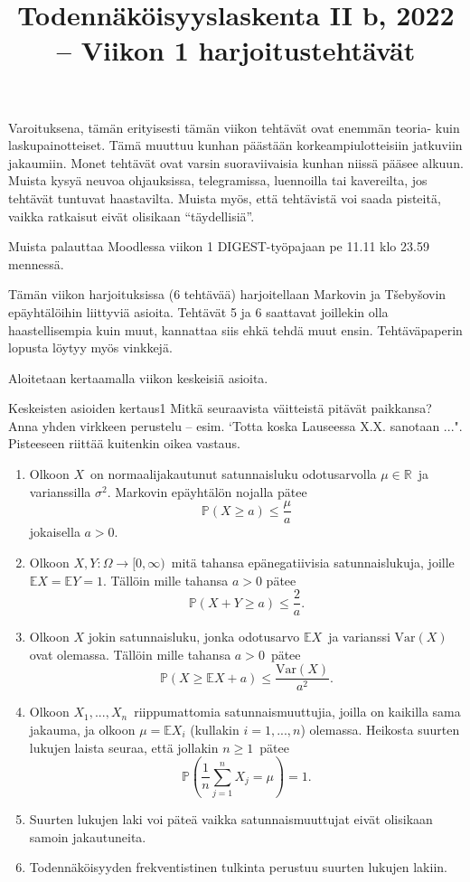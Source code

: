 \documentclass[11pt,a4paper]{amsart}
\title{Todennäköisyyslaskenta II b, 2022 -- Viikon 1 harjoitustehtävät}
\newcommand{\R}{\mathbb{R}}
\newcommand{\E}{\mathbb{E}}
\newcommand{\1}{\mathbf{1}}
\renewcommand{\P}{\mathbb P}
\begin{document}
\maketitle


Varoituksena, tämän erityisesti tämän viikon tehtävät ovat enemmän teoria- kuin laskupainotteiset. Tämä muuttuu kunhan päästään korkeampiulotteisiin jatkuviin jakaumiin. Monet tehtävät ovat varsin suoraviivaisia kunhan niissä pääsee alkuun. Muista kysyä neuvoa ohjauksissa, telegramissa, luennoilla tai kavereilta, jos tehtävät tuntuvat haastavilta. Muista myös, että tehtävistä voi saada pisteitä, vaikka ratkaisut eivät olisikaan ``täydellisiä''.

Muista palauttaa Moodlessa viikon 1 DIGEST-työpajaan pe 11.11 klo 23.59 mennessä.

\medskip 

Tämän viikon harjoituksissa (6 tehtävää) harjoitellaan Markovin ja T\v{s}eby\v{s}ovin epäyhtälöihin liittyviä asioita. Tehtävät 5 ja 6 saattavat joillekin olla haastellisempia kuin muut, kannattaa siis ehkä tehdä muut ensin. Tehtäväpaperin lopusta löytyy myös vinkkejä.

Aloitetaan kertaamalla viikon keskeisiä asioita.
\begin{Exercises}{Keskeisten asioiden kertaus}{1}
Mitkä seuraavista väitteistä pitävät paikkansa? Anna yhden virkkeen perustelu -- esim. `Totta koska Lauseessa X.X. sanotaan ...". Pisteeseen riittää kuitenkin oikea vastaus. 
\begin{enumerate}
\item Olkoon $X$ on normaalijakautunut satunnaisluku odotusarvolla $\mu\in \R$ ja varianssilla $\sigma^2$. Markovin epäyhtälön nojalla pätee 
\[
\P(X\geq a)\leq \frac{\mu}{a}
\]
jokaisella $a>0$.

\item Olkoon $X,Y:\Omega\to [0,\infty)$ mitä tahansa epänegatiivisia satunnaislukuja, joille $\E X=\E Y=1$. Tällöin mille tahansa $a>0$ pätee 
\[
\P(X+Y\geq a)\leq \frac{2}{a}.
\]

\item  Olkoon $X$ jokin satunnaisluku, jonka odotusarvo $\E X$ ja varianssi $\mathrm{Var}(X)$ ovat olemassa. Tällöin mille tahansa $a>0$ pätee
\[
\P(X\geq \E X+a)\leq \frac{\mathrm{Var}(X)}{a^2}.
\]

\item Olkoon $X_1,...,X_n$ riippumattomia satunnaismuuttujia, joilla on kaikilla sama jakauma, ja olkoon $\mu=\E X_i$ (kullakin $i=1,...,n$) olemassa. Heikosta suurten lukujen laista seuraa, että jollakin $n\geq 1$ pätee
\[
\P\left(\frac{1}{n}\sum_{j=1}^nX_j=\mu\right)=1.
\]

\item Suurten lukujen laki voi päteä vaikka satunnaismuuttujat eivät olisikaan samoin jakautuneita.

\item Todennäköisyyden frekventistinen tulkinta perustuu suurten lukujen lakiin.

\end{enumerate}
\end{Exercises}
\end{document}
